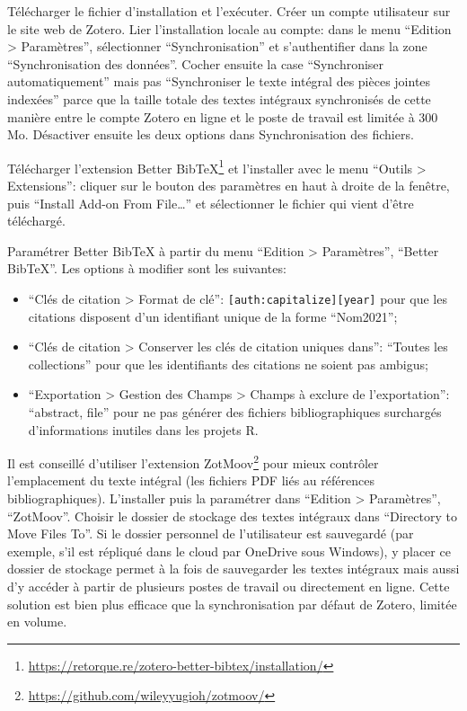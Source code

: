 \documentclass[
  12pt,
  french,
  a4paper,
  extrafontsizes,onecolumn,openright
  ]{memoir}
\providecommand{\tightlist}{%
  \setlength{\itemsep}{0pt}\setlength{\parskip}{0pt}}
\begin{document}
Télécharger le fichier d'installation et l'exécuter.
Créer un compte utilisateur sur le site web de Zotero.
Lier l'installation locale au compte: dans le menu \enquote{Edition \textgreater{} Paramètres}, sélectionner \enquote{Synchronisation} et s'authentifier dans la zone \enquote{Synchronisation des données}.
Cocher ensuite la case \enquote{Synchroniser automatiquement} mais pas \enquote{Synchroniser le texte intégral des pièces jointes indexées} parce que la taille totale des textes intégraux synchronisés de cette manière entre le compte Zotero en ligne et le poste de travail est limitée à 300 Mo.
Désactiver ensuite les deux options dans Synchronisation des fichiers.

Télécharger l'extension Better BibTeX\footnote{\url{https://retorque.re/zotero-better-bibtex/installation/}} et l'installer avec le menu \enquote{Outils \textgreater{} Extensions}: cliquer sur le bouton des paramètres en haut à droite de la fenêtre, puis \enquote{Install Add-on From File\ldots{}} et sélectionner le fichier qui vient d'être téléchargé.

Paramétrer Better BibTeX à partir du menu \enquote{Edition \textgreater{} Paramètres}, \enquote{Better BibTeX}.
Les options à modifier sont les suivantes:

\begin{itemize}
\tightlist
\item
  \enquote{Clés de citation \textgreater{} Format de clé}: \texttt{{[}auth:capitalize{]}{[}year{]}} pour que les citations disposent d'un identifiant unique de la forme \enquote{Nom2021};
\item
  \enquote{Clés de citation \textgreater{} Conserver les clés de citation uniques dans}: \enquote{Toutes les collections} pour que les identifiants des citations ne soient pas ambigus;
\item
  \enquote{Exportation \textgreater{} Gestion des Champs \textgreater{} Champs à exclure de l'exportation}: \enquote{abstract, file} pour ne pas générer des fichiers bibliographiques surchargés d'informations inutiles dans les projets R.
\end{itemize}

Il est conseillé d'utiliser l'extension ZotMoov\footnote{\url{https://github.com/wileyyugioh/zotmoov/}} pour mieux contrôler l'emplacement du texte intégral (les fichiers PDF liés au références bibliographiques).
L'installer puis la paramétrer dans \enquote{Edition \textgreater{} Paramètres}, \enquote{ZotMoov}.
Choisir le dossier de stockage des textes intégraux dans \enquote{Directory to Move Files To}.
Si le dossier personnel de l'utilisateur est sauvegardé (par exemple, s'il est répliqué dans le cloud par OneDrive sous Windows), y placer ce dossier de stockage permet à la fois de sauvegarder les textes intégraux mais aussi d'y accéder à partir de plusieurs postes de travail ou directement en ligne.
Cette solution est bien plus efficace que la synchronisation par défaut de Zotero, limitée en volume.
\end{document}
